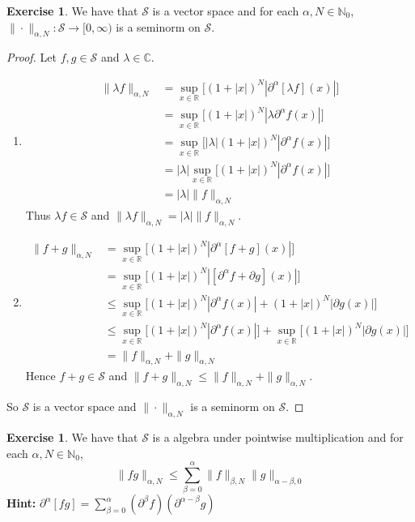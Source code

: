 \documentclass[12pt]{amsart}
\theoremstyle{definition}
\newtheorem{ex}[definition]{Exercise}
\newcommand{\p}{\partial}
\newcommand{\al}{\alpha}
\newcommand{\bet}{\beta}
\newcommand{\lam}{\lambda}
\newcommand{\C}{\mathbb{C}}
\newcommand{\N}{\mathbb{N}}
\newcommand{\R}{\mathbb{R}}
\newcommand{\MS}{\mathcal{S}}
\newcommand{\Rg}{[0,\infty)}
\begin{document}
	\begin{ex} We have that $\MS$ is a vector space and for each $\al, N \in \N_0$,  $\| \cdot \|_{\al, N}: \MS \rightarrow \Rg$ is a seminorm on $\MS$.
	\end{ex}

	\begin{proof} Let $f, g \in \MS$ and $\lam \in \C$.
		\begin{enumerate}
			\item 
			\begin{align*}
				\|\lam f\|_{\al, N}
				& = \sup_{x \in \R} \bigg[  (1 + |x|)^N |\p^{\al}[\lam f] (x)| \bigg] \\
				& = \sup_{x \in \R} \bigg[  (1 + |x|)^N |\lam \p^{\al}f (x)| \bigg] \\
				& = \sup_{x \in \R} \bigg[  |\lam| (1 + |x|)^N | \p^{\al}f (x)| \bigg] \\
				& = |\lam| \sup_{x \in \R} \bigg[ (1 + |x|)^N | \p^{\al}f (x)| \bigg] \\
				& = |\lam | \|f\|_{\al, N}
			\end{align*}
			Thus $\lam f \in \MS$ and $\|\lam f\|_{\al, N} = |\lam | \|f\|_{\al, N}$.
		\item \begin{align*}
			\|f  +  g\|_{\al, N} 
			& = \sup_{x \in \R} \bigg[  (1 + |x|)^N |\p^{\al}[f + g] (x)| \bigg] \\
			& = \sup_{x \in \R} \bigg[  (1 + |x|)^N |[\p^{\al} f  + \p g] (x)| \bigg] \\
			& \leq \sup_{x \in \R} \bigg[  (1 + |x|)^N |\p^{\al} f (x)|  +  (1 + |x|)^N |\p g (x)| \bigg] \\
			& \leq \sup_{x \in \R} \bigg[  (1 + |x|)^N |\p^{\al} f (x)| \bigg]   + \sup_{x \in \R} \bigg[ (1 + |x|)^N |\p g (x)| \bigg] \\
			& = \|f\|_{\al, N} + \|g\|_{\al, N} 
		\end{align*}
	 	Hence $f + g \in \MS$ and $\|f + g\|_{\al, N} \leq \|f\|_{\al, N} + \|g\|_{\al, N}$.
		\end{enumerate}
		So $\MS$ is a vector space and $\| \cdot \|_{\al, N}$ is a seminorm on $\MS$.
	\end{proof}

	\begin{ex}
		We have that $\MS$ is a algebra under pointwise multiplication and for each $\al, N \in \N_0$, 
		$$\|fg\|_{\al, N} \leq \sum\limits_{\bet=0}^\al  \|f\|_{\bet, N} \|g\|_{\al - \bet, 0}$$
		\textbf{Hint:} $\p^{\al}[fg] = \sum\limits_{\bet=0}^\al (\p^{\bet}f) (\p^{\al - \bet}g)$
	\end{ex}
\end{document}
